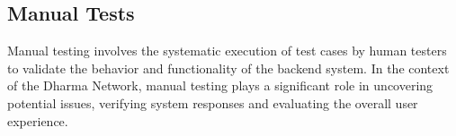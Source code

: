 \subsection{Manual Tests}
Manual testing involves the systematic execution of test cases by human testers to validate the behavior and functionality of the backend system. In the context of the Dharma Network, manual testing plays a significant role in uncovering potential issues, verifying system responses and evaluating the overall user experience.\newline

